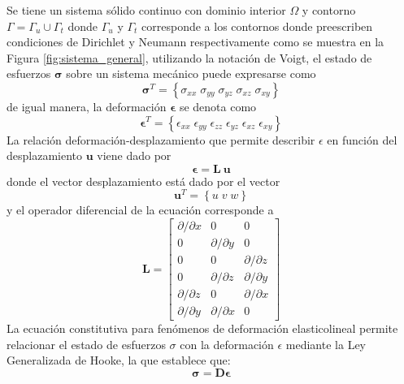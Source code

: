 Se tiene un sistema sólido continuo con dominio interior $\Omega$ y contorno $\Gamma = \Gamma_u \cup \Gamma_t$ donde $\Gamma_u$ y $\Gamma_t$ corresponde a los contornos donde preescriben condiciones de Dirichlet y Neumann respectivamente como se muestra en la Figura \ref{fig:sistema_general}, utilizando la notación de Voigt, el estado de esfuerzos $\bm{\sigma}$ sobre un sistema mecánico puede expresarse como 
\begin{equation}
    \bm{\sigma}^T = \left\{ \sigma_{xx} \; \sigma_{yy} \; \sigma_{yz} \; \sigma_{xz} \; \sigma_{xy} \right\}
\end{equation}
de igual manera, la deformación $\bm{\epsilon}$ se denota como
\begin{equation}
    \bm{\epsilon}^T = \left\{ \epsilon_{xx} \; \epsilon_{yy} \; \epsilon_{zz} \; \epsilon_{yz} \; \epsilon_{xz} \; \epsilon_{xy} \right\}
\end{equation}
La relación deformación-desplazamiento que permite describir $\epsilon$ en función del desplazamiento $\bm{u}$ viene dado por
\begin{equation} \label{eq:strain-displacement}
    \bm{\epsilon} = \bm{L} \: \bm{u}
\end{equation}
donde el vector desplazamiento está dado por el vector
\begin{equation}
    \bm{u}^T = \left\{ u \; v \; w \right\} 
\end{equation}
y el operador diferencial de la ecuación corresponde a
\begin{equation}
    \bm{L} = \begin{bmatrix} 
                       \partial/\partial x & 0 & 0 \\
                       0 & \partial/\partial y & 0 \\
                       0 & 0 & \partial/\partial z \\
                       0 & \partial/\partial z & \partial/\partial y \\
                       \partial/\partial z & 0 & \partial/\partial x \\
                       \partial/\partial y & \partial/\partial x & 0 
             \end{bmatrix}
\end{equation}
La ecuación constitutiva para fenómenos de deformación elasticolineal permite relacionar el estado de esfuerzos $\sigma$ con la deformación $\epsilon$ mediante la Ley Generalizada de Hooke, la que establece que:
\begin{equation} \label{eq:ley_de_hooke}
    \bm{\sigma} = \bm{D} \bm{\epsilon}
\end{equation}
